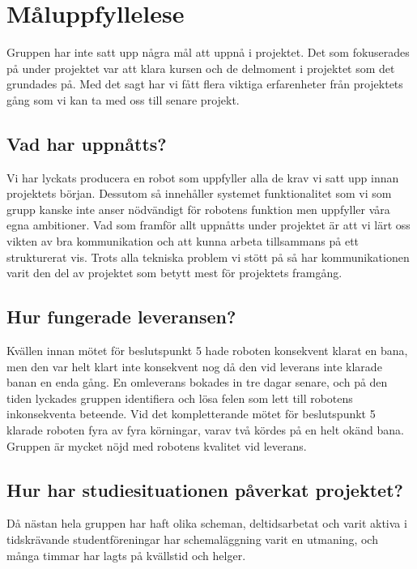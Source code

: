 \documentclass{article}
\begin{document}
\clearpage
\section{Måluppfyllelese}
Gruppen har inte satt upp några mål att uppnå i projektet. Det som fokuserades på under projektet var att klara kursen och de delmoment i projektet som det grundades på. Med det sagt har vi fått flera viktiga erfarenheter från projektets gång som vi kan ta med oss till senare projekt.

\subsection{Vad har uppnåtts?}
Vi har lyckats producera en robot som uppfyller alla de krav vi satt upp innan projektets början. Dessutom så innehåller systemet funktionalitet som vi som grupp kanske inte anser nödvändigt för robotens funktion men uppfyller våra egna ambitioner. Vad som framför allt uppnåtts under projektet är att vi lärt oss vikten av bra kommunikation och att kunna arbeta tillsammans på ett strukturerat vis. Trots alla tekniska problem vi stött på så har kommunikationen varit den del av projektet som betytt mest för projektets framgång.

\subsection{Hur fungerade leveransen?}
Kvällen innan mötet för beslutspunkt 5 hade roboten konsekvent klarat en bana, men den var helt klart inte konsekvent nog då den vid leverans inte klarade banan en enda gång. En omleverans bokades in tre dagar senare, och på den tiden lyckades gruppen identifiera och lösa felen som lett till robotens inkonsekventa beteende. Vid det kompletterande mötet för beslutspunkt 5 klarade roboten fyra av fyra körningar, varav två kördes på en helt okänd bana. Gruppen är mycket nöjd med robotens kvalitet vid leverans.

\subsection{Hur har studiesituationen påverkat projektet?}
Då nästan hela gruppen har haft olika scheman, deltidsarbetat och varit aktiva i tidskrävande studentföreningar har schemaläggning varit en utmaning, och många timmar har lagts på kvällstid och helger. 

\clearpage
\end{document}
